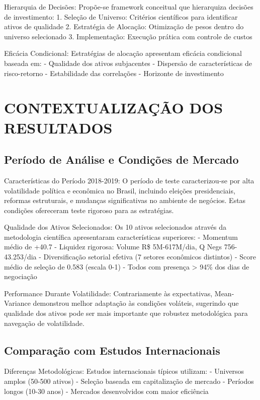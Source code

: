 Hierarquia de Decisões: Propõe-se framework conceitual que hierarquiza decisões de investimento:
1. Seleção de Universo: Critérios científicos para identificar ativos de qualidade
2. Estratégia de Alocação: Otimização de pesos dentro do universo selecionado
3. Implementação: Execução prática com controle de custos

Eficácia Condicional: Estratégias de alocação apresentam eficácia condicional baseada em:
- Qualidade dos ativos subjacentes
- Dispersão de características de risco-retorno
- Estabilidade das correlações
- Horizonte de investimento

\section{CONTEXTUALIZAÇÃO DOS RESULTADOS}

\subsection{Período de Análise e Condições de Mercado}

Características do Período 2018-2019: O período de teste caracterizou-se por alta volatilidade política e econômica no Brasil, incluindo eleições presidenciais, reformas estruturais, e mudanças significativas no ambiente de negócios. Estas condições ofereceram teste rigoroso para as estratégias.

Qualidade dos Ativos Selecionados: Os 10 ativos selecionados através da metodologia científica apresentaram características superiores:
- Momentum médio de +40.7%
- Liquidez rigorosa: Volume R\$ 5M-617M/dia, Q Negs 756-43.253/dia
- Diversificação setorial efetiva (7 setores econômicos distintos)
- Score médio de seleção de 0.583 (escala 0-1)
- Todos com presença > 94\% dos dias de negociação

Performance Durante Volatilidade: Contrariamente às expectativas, Mean-Variance demonstrou melhor adaptação às condições voláteis, sugerindo que qualidade dos ativos pode ser mais importante que robustez metodológica para navegação de volatilidade.

\subsection{Comparação com Estudos Internacionais}

Diferenças Metodológicas: Estudos internacionais típicos utilizam:
- Universos amplos (50-500 ativos)
- Seleção baseada em capitalização de mercado
- Períodos longos (10-30 anos)
- Mercados desenvolvidos com maior eficiência

